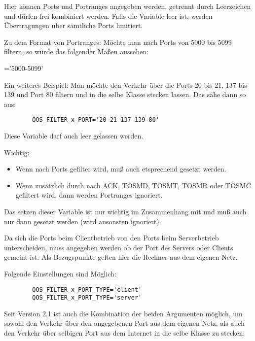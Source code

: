 \begin{description}
   Hier können Ports und Portranges angegeben werden, getrennt durch
   Leerzeichen und dürfen frei kombiniert werden. Falls die Variable leer
   ist, werden Übertragungen über sämtliche Ports limitiert.

   Zu dem Format von Portranges: Möchte man nach Ports von 5000 bis 5099
   filtern, so würde das folgender Maßen aussehen:

='5000-5099'

   Ein weiteres Beispiel:
   Man möchte den Verkehr über die Ports 20 bis 21, 137 bis 139 und Port
   80 filtern und in die selbe Klasse stecken lassen. Das sähe dann so
   aus:

\begin{example}
\begin{verbatim}
        QOS_FILTER_x_PORT='20-21 137-139 80'
\end{verbatim}
\end{example}

   Diese Variable darf auch leer gelassen werden.

   Wichtig:
   \begin{itemize}
   \item  Wenn nach Ports gefilter wird, muß auch 
   etsprechend gesetzt werden.


 \item Wenn zusätzlich durch  nach ACK, TOSMD,
   TOSMT, TOSMR oder TOSMC gefiltert wird, dann werden Portranges
   ignoriert.
   \end{itemize}



   Das setzen dieser Variable ist nur wichtig im Zusammenhang mit
    und muß auch nur dann gesetzt werden (wird
   ansonsten ignoriert).

   Da sich die Ports beim Clientbetrieb von den Ports beim Serverbetrieb
   unterscheiden, muss angegeben werden ob der Port des Servers oder
   Clients gemeint ist. Als Bezugspunkte gelten hier die Rechner aus dem
   eigenen Netz.

   Folgende Einstellungen sind Möglich:

\begin{example}
\begin{verbatim}
        QOS_FILTER_x_PORT_TYPE='client'
        QOS_FILTER_x_PORT_TYPE='server'
\end{verbatim}
\end{example}
   Seit Version 2.1 ist auch die Kombination der beiden Argumenten
   möglich, um sowohl den Verkehr über den angegebenen Port aus dem
   eigenen Netz, als auch den Verkehr über selbigen Port aus dem Internet
   in die selbe Klasse zu stecken:


\end{description}
